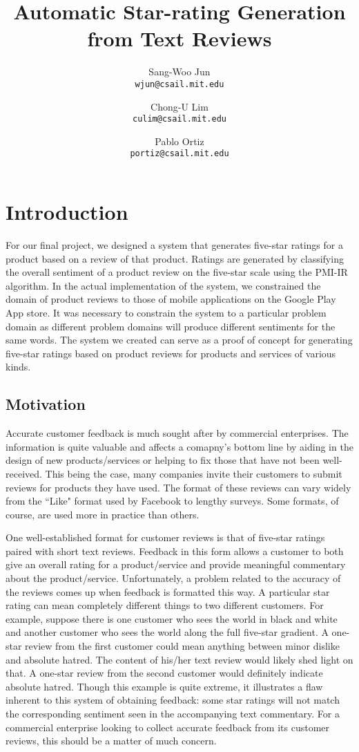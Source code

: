 \documentclass[11pt]{report} %
\title{Automatic Star-rating Generation from Text Reviews}
\author{
  Sang-Woo Jun\\
  \texttt{wjun@csail.mit.edu}
  \and
  Chong-U Lim\\
  \texttt{culim@csail.mit.edu}
  \and
  Pablo Ortiz\\
  \texttt{portiz@csail.mit.edu}
}
\begin{document}
\maketitle

\tableofcontents

\newpage
\chapter{Introduction}
For our final project, we designed a system that generates five-star ratings for a product based on a review of that product. Ratings are generated by classifying the overall sentiment of a product review on the five-star scale using the PMI-IR algorithm. In the actual implementation of the system, we constrained the domain of product reviews to those of mobile applications on the Google Play App store. It was necessary to constrain the system to a particular problem domain as different problem domains will produce different sentiments for the same words. The system we created can serve as a proof of concept for generating five-star ratings based on product reviews for products and services of various kinds.

\section{Motivation}


Accurate customer feedback is much sought after by commercial enterprises. The information is quite valuable and affects a comapny's bottom line by aiding in the design of new products/services or helping to fix those that have not been well-received. This being the  case, many companies invite their customers to submit reviews for products they have used. The format of these reviews can vary widely from the ``Like" format used by Facebook to lengthy surveys. Some formats, of course, are used more in practice than others.


One well-established format for customer reviews is that of five-star ratings paired with short text reviews. Feedback in this form allows a customer to both give an overall rating for a product/service and provide meaningful commentary about the product/service. Unfortunately, a problem related to the accuracy of the reviews comes up when feedback is formatted this way. A particular star rating can mean completely different things to two different customers. For example, suppose there is one customer who sees the world in black and white and another customer who sees the world along the full five-star gradient. A one-star review from the first customer could mean anything between minor dislike and absolute hatred. The content of his/her text review would likely shed light on that. A one-star review from the second customer would definitely indicate absolute hatred. Though this example is quite extreme, it illustrates a flaw inherent to this system of obtaining feedback: some star ratings will not match the corresponding sentiment seen in the accompanying text commentary. For a commercial enterprise looking to collect accurate feedback from its customer reviews, this should be a matter of much concern.
\end{document}
